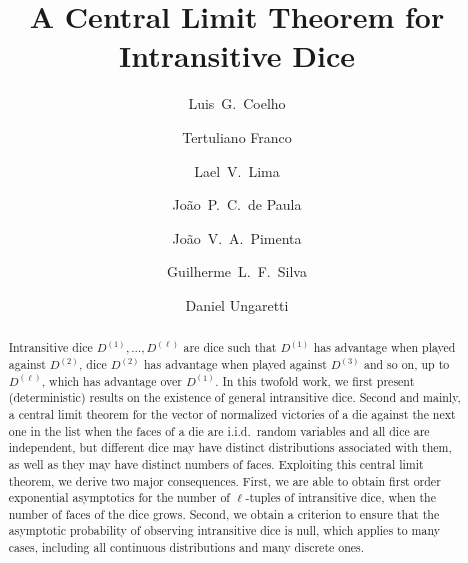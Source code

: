 \documentclass[reqno,a4paper,11pt]{amsart}
\theoremstyle{remark}
\numberwithin{equation}{section}
\begin{document}
\title{A Central Limit Theorem for Intransitive Dice}


\author[L.\ Coelho]{Luis\ G.\ Coelho}
\address[LC]{Faculdade de Filosofia, Ci\^encias e Letras de Ribeir\~ao Preto, Universidade de S\~ao Paulo, Brazil}


\author[T.~Franco]{Tertuliano Franco}
\address[TF]{UFBA\\
 Instituto de Matem\'atica, Campus de Ondina, Av. Adhemar de Barros, S/N. CEP 40170-110\\
Salvador, Brazil}

\author[L.\ Lima]{Lael\ V.\ Lima}
\address[LL]{Instituto de Matemática, Estatística e Computação Científica, Universidade Estadual de Campinas, Brazil}

\author[J.\ de Paula]{João\ P.\ C.\ de Paula}
\address[JPa]{Instituto de Matemática, Estatística e Computação Científica, Universidade Estadual de Campinas, Brazil}

\author[J.\ Pimenta]{João\ V.\ A.\ Pimenta}
\address[JP]{Instituto de F\'isica de S\~ao Carlos, Universidade de S\~ao Paulo, Brazil}

\author[G.\ Silva]{Guilherme\ L.\ F.\ Silva}
\address[GS]{Instituto de Ciências Matemáticas e de Computação, Universidade de S\~ao Paulo, Brazil.}

\author[D.\ Ungaretti]{Daniel Ungaretti}
\address[DU]{Instituto de Matem\'atica, Universidade Federal do Rio de Janeiro, Brazil}



\date{}

\begin{abstract}
    Intransitive dice $D^{(1)}, \ldots, D^{(\ell)}$ are dice such that $D^{(1)}$ has advantage when played against $D^{(2)}$, dice $D^{(2)}$ has advantage when played against $D^{(3)}$ and so on, up to $D^{(\ell)}$, which has advantage over $D^{(1)}$.  In this twofold work, we first present (deterministic) results on the existence of general intransitive dice. Second and mainly, a central limit theorem for the vector of normalized victories of a die against the next one in the list when the faces of a die are i.i.d.\ random variables and all dice are independent, but different dice may have distinct distributions associated with them, as well as they may have distinct numbers of faces. Exploiting this central limit theorem, we derive two major consequences. First, we are able to obtain first order exponential asymptotics for the number of $\ell$-tuples of intransitive dice, when the number of faces of the dice grows. Second, we obtain a criterion to ensure that the asymptotic  probability of observing intransitive dice is null, which applies to many cases, including all continuous distributions and many discrete ones.

\end{abstract}
\end{document}
